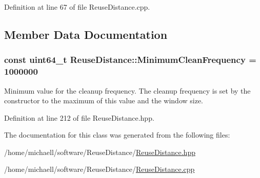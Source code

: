 Definition at line 67 of file ReuseDistance.cpp.



\subsection{Member Data Documentation}
\hypertarget{class_reuse_distance_a3aebe8066043c0875b427418a8326a3a}{
\subsubsection[{MinimumCleanFrequency}]{\setlength{\rightskip}{0pt plus 5cm}const uint64\_\-t {\bf ReuseDistance::MinimumCleanFrequency} = 1000000}}
\label{class_reuse_distance_a3aebe8066043c0875b427418a8326a3a}
Minimum value for the cleanup frequency. The cleanup frequency is set by the constructor to the maximum of this value and the window size. 

Definition at line 212 of file ReuseDistance.hpp.



The documentation for this class was generated from the following files:\begin{DoxyCompactItemize}
\item 
/home/michaell/software/ReuseDistance/\hyperlink{_reuse_distance_8hpp}{ReuseDistance.hpp}\item 
/home/michaell/software/ReuseDistance/\hyperlink{_reuse_distance_8cpp}{ReuseDistance.cpp}\end{DoxyCompactItemize}
